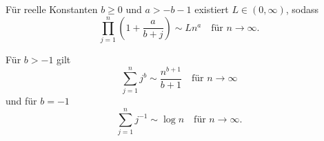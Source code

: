 \documentclass[ngerman,a4paper,11pt]{scrartcl}
\begin{document}
\begin{lem}
  \begin{thmlist}
  \item Für reelle Konstanten $b\geq 0$ und $a>-b-1$ existiert $L\in(0,\infty)$,
    sodass\label{lem:sim:prod}
    \begin{equation*}
      \prod_{j=1}^n\left( 1+\frac{a}{b+j} \right) \sim Ln^a\quad\text{für $n\to\infty$.} 
    \end{equation*}
  \item Für $b>-1$ gilt
    \begin{equation*}
      \sum_{j=1}^nj^b \sim \frac{n^{b+1}}{b+1}\quad\text{für $n\to\infty$} 
    \end{equation*}
und für $b=-1$\label{lem:sim:sum}
    \begin{equation*}
      \sum_{j=1}^nj^{-1} \sim \log n\quad\text{für $n\to\infty$.} 
    \end{equation*}
  \end{thmlist}
\end{lem}
\end{document}
